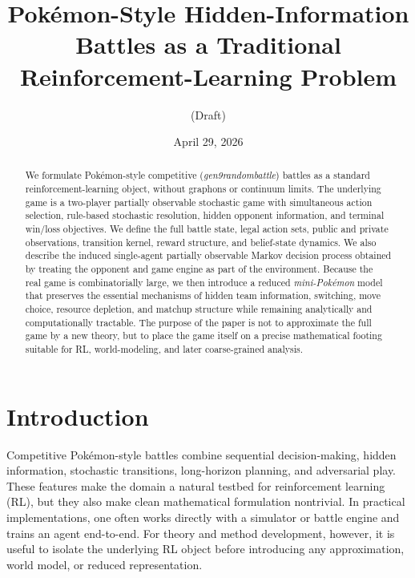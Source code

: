 \documentclass[aps,pre,twocolumn,superscriptaddress,nofootinbib]{revtex4-2}
\theoremstyle{definition}
\theoremstyle{plain}
\begin{document}
\title{Pok\'emon-Style Hidden-Information Battles as a Traditional Reinforcement-Learning Problem}

\author{(Draft)}
\date{April 29, 2026}

\begin{abstract}
    We formulate Pok\'emon-style competitive (\emph{gen9randombattle}) battles as a standard reinforcement-learning object, without graphons or continuum limits. The underlying game is a two-player partially observable stochastic game with simultaneous action selection, rule-based stochastic resolution, hidden opponent information, and terminal win/loss objectives. We define the full battle state, legal action sets, public and private observations, transition kernel, reward structure, and belief-state dynamics. We also describe the induced single-agent partially observable Markov decision process obtained by treating the opponent and game engine as part of the environment. Because the real game is combinatorially large, we then introduce a reduced \emph{mini-Pok\'emon} model that preserves the essential mechanisms of hidden team information, switching, move choice, resource depletion, and matchup structure while remaining analytically and computationally tractable. The purpose of the paper is not to approximate the full game by a new theory, but to place the game itself on a precise mathematical footing suitable for RL, world-modeling, and later coarse-grained analysis.
\end{abstract}

\maketitle

\section{Introduction}

Competitive Pok\'emon-style battles combine sequential decision-making, hidden information, stochastic transitions, long-horizon planning, and adversarial play. These features make the domain a natural testbed for reinforcement learning (RL), but they also make clean mathematical formulation nontrivial. In practical implementations, one often works directly with a simulator or battle engine and trains an agent end-to-end. For theory and method development, however, it is useful to isolate the underlying RL object before introducing any approximation, world model, or reduced representation.
\end{document}
